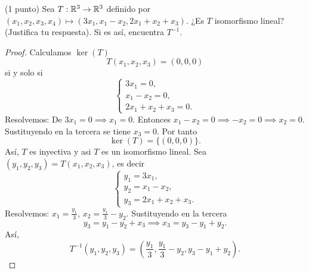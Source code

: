 \documentclass[12pt,a4paper]{article}
\begin{document}
    \begin{mdframed}[style=mdpinkbox,frametitle={Ejercicio 4}]
        (1 punto) Sea $T:\mathbb{R}^{3}\to\mathbb{R}^{3}$ definido por $(x_{1},x_{2},x_{3},x_{4})\mapsto(3x_{1},x_{1}-x_{2},2x_{1}+x_{2}+x_{3})$.
        ¿Es $T$ isomorfismo lineal? (Justifica tu respuesta). Si es así, encuentra $T^{-1}$.
    \end{mdframed}

    \begin{proof}
        Calculamos $\ker(T)$
        \begin{equation*}
            T(x_{1},x_{2},x_{3})=(0,0,0)
        \end{equation*}
        si y solo si
        \begin{equation*}
            \begin{cases}
                3x_{1}=0,\\
                x_{1}-x_{2}=0,\\
                2x_{1}+x_{2}+x_{3}=0.
            \end{cases}
        \end{equation*}
        Resolvemos: De $3x_{1}=0\implies x_{1}=0$. Entonces $x_{1}-x_{2}=0\implies-x_{2}=0\implies x_{2}=0$.
        Sustituyendo en la tercera se tiene $x_{3}=0$. Por tanto
        \begin{equation*}
            \ker(T)=\{(0,0,0)\}.
        \end{equation*}
        Así, $T$ es inyectiva y asi $T$ es un isomorfismo lineal. Sea $(y_{1},y_{2},y_{3})=T(x_{1},x_{2},x_{3})$,
        es decir
        \begin{equation*}
            \begin{cases}
                y_{1}=3x_{1},\\
                y_{2}=x_{1}-x_{2},\\
                y_{3}=2x_{1}+x_{2}+x_{3}.
            \end{cases}
        \end{equation*}
        Resolvemos: $x_{1}=\frac{y_{1}}{3}$, $x_{2}=\frac{y_{1}}{3}-y_{2}$. Sustituyendo en la tercera
        \begin{equation*}
            y_{3}=y_{1}-y_{2}+x_{3}\implies x_{3}=y_{3}-y_{1}+y_{2}.
        \end{equation*}
        Así,
        \begin{equation*}
            T^{-1}(y_{1},y_{2},y_{3})=(\frac{y_{1}}{3},\frac{y_{1}}{3}-y_{2},y_{3}-y_{1}+y_{2}).
        \end{equation*}
    \end{proof}
\end{document}
